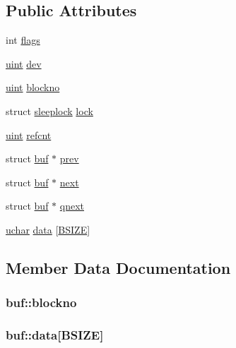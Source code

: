\subsection*{Public Attributes}
\begin{DoxyCompactItemize}
\item 
int \hyperlink{structbuf_ae7d6b6c34fdeadb38970efd0554aa1a9}{flags}
\item 
\hyperlink{types_8h_a91ad9478d81a7aaf2593e8d9c3d06a14}{uint} \hyperlink{structbuf_ac96082c2b5f22133ac7092ef81487227}{dev}
\item 
\hyperlink{types_8h_a91ad9478d81a7aaf2593e8d9c3d06a14}{uint} \hyperlink{structbuf_a756b2bcc88008bef7f21d688aa4a7a48}{blockno}
\item 
struct \hyperlink{structsleeplock}{sleeplock} \hyperlink{structbuf_a626ad748d91d4bd7f4e65b74c73f2644}{lock}
\item 
\hyperlink{types_8h_a91ad9478d81a7aaf2593e8d9c3d06a14}{uint} \hyperlink{structbuf_aaf5efe777371aaeb9944508fd52adda5}{refcnt}
\item 
struct \hyperlink{structbuf}{buf} $\ast$ \hyperlink{structbuf_a930cab1e1b3751795d31bfd0291dff4a}{prev}
\item 
struct \hyperlink{structbuf}{buf} $\ast$ \hyperlink{structbuf_ab18c18abb22f07617619e9a74c71f51a}{next}
\item 
struct \hyperlink{structbuf}{buf} $\ast$ \hyperlink{structbuf_aba5c088c4da07a5ec88edfacdae9b85a}{qnext}
\item 
\hyperlink{types_8h_a65f85814a8290f9797005d3b28e7e5fc}{uchar} \hyperlink{structbuf_ab0ec38784ab94ed35e575cf6d33912d2}{data} \mbox{[}\hyperlink{fs_8h_a403cf3149c084cea115b85c90721039a}{B\+S\+I\+ZE}\mbox{]}
\end{DoxyCompactItemize}


\subsection{Member Data Documentation}
\subsubsection[{\texorpdfstring{blockno}{blockno}}]{ buf\+::blockno}\hypertarget{structbuf_a756b2bcc88008bef7f21d688aa4a7a48}{}\label{structbuf_a756b2bcc88008bef7f21d688aa4a7a48}
\subsubsection[{\texorpdfstring{data}{data}}]{ buf\+::data\mbox{[}{\bf B\+S\+I\+ZE}\mbox{]}}\hypertarget{structbuf_ab0ec38784ab94ed35e575cf6d33912d2}{}\label{structbuf_ab0ec38784ab94ed35e575cf6d33912d2}
